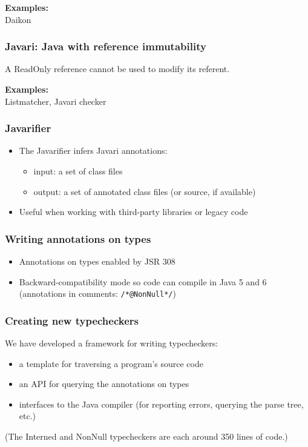\documentclass{beamer}
\begin{document}
\frame
{
  \begin{center}
  {\bf\large Examples:} \\ Daikon
  \end{center}
}


\frame
{
  \frametitle{Javari: Java with reference immutability}

  A ReadOnly reference cannot be used to modify its referent.

  \begin{center}
  \end{center} 
}

\frame
{
  \begin{center}
  {\bf\large Examples:} \\ Listmatcher, Javari checker
  \end{center}
}

\frame
{
  \frametitle{Javarifier}

  \begin{itemize}
  \item The Javarifier infers Javari annotations:

  \begin{itemize}
  \item input: a set of class files
  \item output: a set of annotated class files (or source, if available)
  \end{itemize}

  \item Useful when working with third-party libraries or legacy code
  \end{itemize}

}


\frame
{
  \frametitle{Writing annotations on types}

  \begin{itemize}
  \item Annotations on types enabled by JSR 308
  \item Backward-compatibility mode so code can compile in Java 5 and 6
  (annotations in comments: \texttt{/*@NonNull*/})
  \end{itemize}
}

\frame
{
  \frametitle{Creating new typecheckers}

  We have developed a framework for writing typecheckers:
  \begin{itemize}
  \item a template for traversing a program's source code
  \item an API for querying the annotations on types
  \item interfaces to the Java compiler (for reporting errors, querying the
        parse tree, etc.)
  \end{itemize}

  (The Interned and NonNull typecheckers are each around 350 lines of code.)

}
\end{document}
